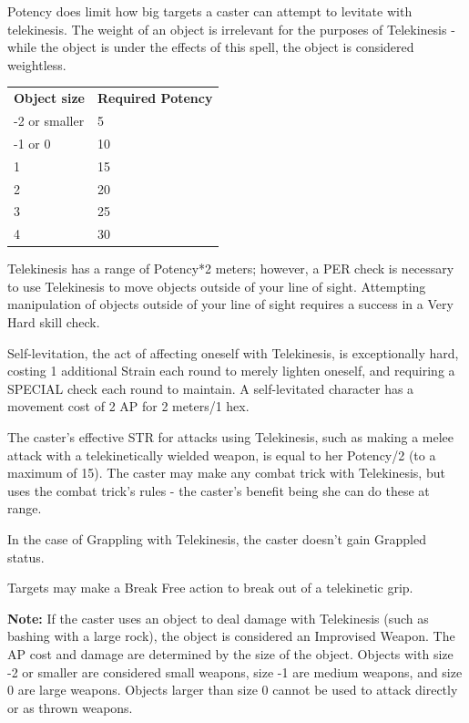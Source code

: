 \documentclass[11pt,a4paper,twocolumn]{book}
\begin{document}
	Potency does limit how big targets a caster can attempt to levitate with telekinesis.
	The weight of an object is irrelevant for the purposes of Telekinesis - while the object is under the effects of this spell, the object is considered weightless.
	
	\medskip
	{
		\begin{tabu} to 75mm{| X[l,7] | X[l,7] |}
			\hline
			\textbf{Object size} 			&\textbf{Required Potency} 			\\
			-2 or smaller					& 5									\\
			-1 or 0     						& 10								\\ 
			1 								& 15								\\
			2								& 20								\\
			3								& 25								\\
			4								& 30								\\ \hline
		\end{tabu}
		
	}
	\medskip
	
	Telekinesis has a range of Potency*2 meters; however, a PER check is necessary to use Telekinesis to move objects outside of your line of sight. Attempting manipulation of objects outside of your line of sight requires a success in a Very Hard skill check.
	
	Self-levitation, the act of affecting oneself with Telekinesis, is exceptionally hard, costing 1 additional Strain each round to merely lighten oneself, and requiring a SPECIAL check each round to maintain. A self-levitated character has a movement cost of 2 AP for 2 meters/1 hex.
	
	The caster's effective STR for attacks using Telekinesis, such as making a melee attack with a telekinetically wielded weapon, is equal to her Potency/2 (to a maximum of 15). The caster may make any combat trick with Telekinesis, but uses the combat trick's rules - the caster's benefit being she can do these at range.
	
	In the case of Grappling with Telekinesis, the caster doesn't gain Grappled status.
	
	Targets may make a Break Free action to break out of a telekinetic grip.
	
	\textbf{Note:} If the caster uses an object to deal damage with Telekinesis (such as bashing with a large rock), the object is considered an Improvised Weapon. The AP cost and damage are determined by the size of the object. Objects with size -2 or smaller are considered small weapons, size -1 are medium weapons, and size 0 are large weapons. Objects larger than size 0 cannot be used to attack directly or as thrown weapons.
	
\end{document}

